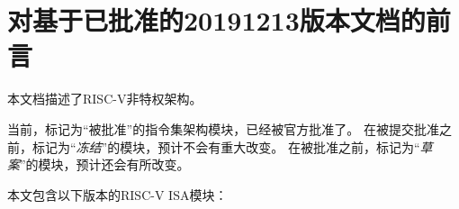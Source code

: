 
\FloatBarrier

\section*{对基于已批准的20191213版本文档的前言}

本文档描述了RISC-V非特权架构。





当前，标记为“被批准”的指令集架构模块，已经被官方批准了。
在被提交批准之前，标记为“{\em 冻结}”的模块，预计不会有重大改变。
在被批准之前，标记为“{\em 草案}”的模块，预计还会有所改变。


本文包含以下版本的RISC-V ISA模块：

